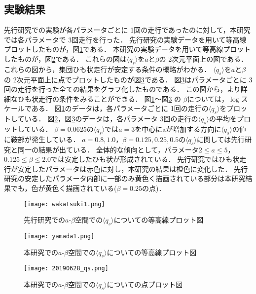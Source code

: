 \documentclass[twocolumn]{jarticle} %
\begin{document}
\subsection{実験結果}
先行研究\cite{wakatsuki}での実験が各パラメータごとに 1回の走行であったのに対して，本研究では各パラメータで 3回走行を行った．
先行研究\cite{wakatsuki}の実験データを用いて等高線プロットしたものが，図\ref{wakatsuki_line}である．
本研究の実験データを用いて等高線プロットしたものが，図\ref{yamada_line}である．
これらの図は$\langle q_s \rangle$を$a$と$\beta$の 2次元平面上の図である．
これらの図から，集団ひも状走行が安定する条件の概略がわかる．
$\langle q_s \rangle$を$a$と$\beta$の 2次元平面上に点でプロットしたものが図\ref{qs_point}である．
図\ref{qs_point}はパラメータごとに 3回の走行を行った全ての結果をグラフ化したものである．
この図から，より詳細なひも状走行の条件をみることができる．
図\ref{wakatsuki_line}〜図\ref{qs_point} の $\beta$については，$\log$スケールである．
図\ref{wakatsuki_line}のデータは，各パラメータごとに 1回の走行の$\langle q_s \rangle$をプロットしている．
図\ref{yamada_line}，図\ref{qs_point}のデータは，各パラメータ 3回の走行の$\langle q_s \rangle$の平均をプロットしている．
$\beta=0.0625$の$\langle q_s \rangle$では$a=3$を中心にaが増加する方向に$\langle q_s \rangle$の値に鞍部が発生している．
$a=0.8,1.0$，$\beta=0.125,0.25,0.5$の$\langle q_s \rangle$に関しては先行研究と同一の結果が出ている．
全体的な傾向として，パラメータ$2\leq a \leq 5$，$ 0.125 \leq \beta \leq 2.0$では安定したひも状が形成されている．
先行研究ではひも状走行が安定したパラメータは赤色に対し，本研究の結果は橙色に変化した．
先行研究の安定したパラメータ内部に一部のみ黄色く描画されている部分は本研究結果でも，色が黄色く描画されている($\beta=0.25$の点)．
\vspace{2mm}
\begin{figure}[t]
  \begin{center}
    \vspace{-4mm}
    \texttt{[image: wakatsuki1.png]}
    \caption{先行研究\cite{wakatsuki}での$a$-$\beta$空間での$\langle q_s \rangle$についての等高線プロット図}
    \label{wakatsuki_line}
  \end{center}
\end{figure}
\begin{figure}[t]
  \begin{center}
    \vspace{-4mm}
    \texttt{[image: yamada1.png]}
    \caption{本研究での$a$-$\beta$空間での$\langle q_s \rangle$についての等高線プロット図}
    \label{yamada_line}
  \end{center}
\end{figure}
\begin{figure}[t]
  \begin{center}
    \texttt{[image: 20190628\_qs.png]}
    \caption{本研究での$a$-$\beta$空間での$\langle q_s \rangle$についての点プロット図}
    \label{qs_point}
  \end{center}
\end{figure}
\vspace{-1mm}
\end{document}
